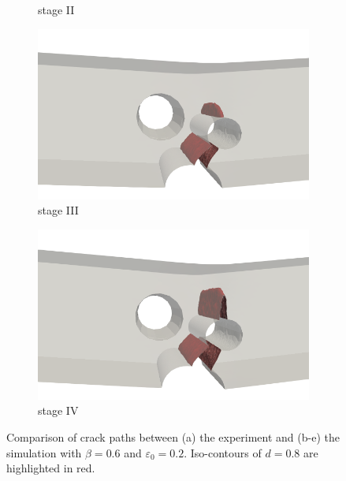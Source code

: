 \begin{figure}[!htb]
\begin{minipage}{0.6\textwidth}
\begin{subfigure}{0.45\textwidth}
      \caption{stage II}
      \label{fig: Chapter5/3pb/1234/simulation_II}
    \end{subfigure}
    
    \begin{subfigure}{0.45\textwidth}
      \centering
      \includegraphics[width=\linewidth]{Chapter5/figures/3pb/III}
      \caption{stage III}
      \label{fig: Chapter5/3pb/1234/simulation_III}
    \end{subfigure}
    \begin{subfigure}{0.45\textwidth}
      \centering
      \includegraphics[width=\linewidth]{Chapter5/figures/3pb/IV}
      \caption{stage IV}
      \label{fig: Chapter5/3pb/1234/simulation_IV}
    \end{subfigure}
  \end{minipage}
  \caption[Comparison of crack paths between the experiment and the simulation.]{Comparison of crack paths between (a) the experiment \cite{kubik2019ductile} and (b-e) the simulation with $\beta = 0.6$ and $\varepsilon_0 = 0.2$. Iso-contours of $d=0.8$ are highlighted in red. }
  \label{fig: Chapter5/3pb/1234}
\end{figure}
